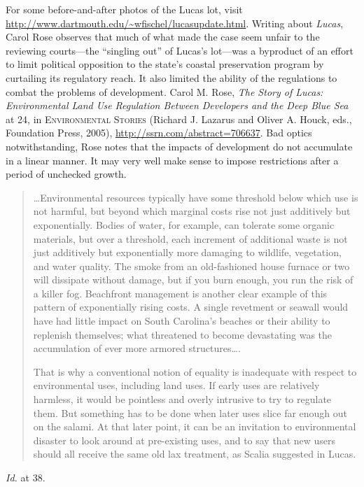 
\item For some before-and-after photos of the Lucas lot, visit
\url{http://www.dartmouth.edu/~wfischel/lucasupdate.html}. Writing about
\textit{Lucas}, Carol Rose observes that much of what made the case seem unfair
to the reviewing courts---the ``singling out'' of Lucas's lot---was a byproduct
of an effort to limit political opposition to the state's coastal preservation
program by curtailing its regulatory reach. It also limited the ability of the
regulations to combat the problems of development. Carol M. Rose, \textit{The
Story of Lucas: Environmental Land Use Regulation Between Developers and the
Deep Blue Sea} at 24, in \textsc{Environmental Stories} (Richard J. Lazarus and
Oliver A. Houck, eds., Foundation Press, 2005),
\url{http://ssrn.com/abstract=706637}. Bad optics notwithstanding, Rose notes
that the impacts of development do not accumulate in a linear manner. It may
very well make sense to impose restrictions after a period of unchecked growth.
\begin{quotation}
\ldots Environmental resources typically have some threshold below which use is
not harmful, but beyond which marginal costs rise not just additively but
exponentially. Bodies of water, for example, can tolerate some organic
materials, but over a threshold, each increment of additional waste is not just
additively but exponentially more damaging to wildlife, vegetation, and water
quality. The smoke from an old-fashioned house furnace or two will dissipate
without damage, but if you burn enough, you run the risk of a killer fog.
Beachfront management is another clear example of this pattern of exponentially
rising costs. A single revetment or seawall would have had little impact on
South Carolina's beaches or their ability to replenish themselves; what
threatened to become devastating was the accumulation of ever more armored
structures\ldots.

That is why a conventional notion of equality is inadequate with respect to
environmental uses, including land uses. If early uses are relatively harmless,
it would be pointless and overly intrusive to try to regulate them. But
something has to be done when later uses slice far enough out on the salami. At
that later point, it can be an invitation to environmental disaster to look
around at pre-existing uses, and to say that new users should all receive the
same old lax treatment, as Scalia suggested in Lucas.
\end{quotation}
\textit{Id.} at 38.


